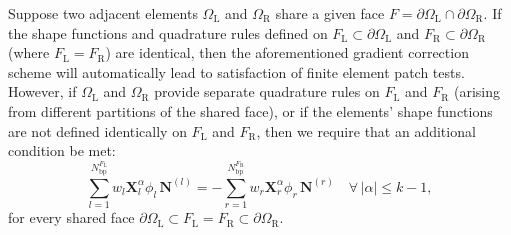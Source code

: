     	Suppose two adjacent elements $\Omega_{\mathrm L}$ and $\Omega_{\mathrm R}$ share a given face $F = \partial \Omega_{\mathrm L} \cap \partial \Omega_{\mathrm R}$. If the shape functions and quadrature rules defined on $F_{\mathrm L} \subset \partial \Omega_{\mathrm L}$ and $F_{\mathrm R} \subset \partial \Omega_{\mathrm R}$ (where $F_{\mathrm L} = F_{\mathrm R}$) are identical, then the aforementioned gradient correction scheme will automatically lead to satisfaction of finite element patch tests. However, if $\Omega_{\mathrm L}$ and $\Omega_{\mathrm R}$ provide separate quadrature rules on $F_{\mathrm L}$ and $F_{\mathrm R}$ (arising from different partitions of the shared face), or if the elements' shape functions are not defined identically on $F_{\mathrm L}$ and $F_{\mathrm R}$, then we require that an additional condition be met:
    	\begin{equation}
    		\sum_{l=1}^{N^{F_{\mathrm L}}_{\mathrm b\mathrm p}} w_l \bm{X}^{\alpha}_l \phi_l \, \bm{N}^{(l)} = - \sum_{r=1}^{N^{F_{\mathrm R}}_{\mathrm b\mathrm p}} w_r \bm{X}^{\alpha}_r \phi_r \, \bm{N}^{(r)} \quad \forall \, | \alpha | \leq k-1,
    		\label{eq:face_constraint}
    	\end{equation}
    	for every shared face $\partial \Omega_{\mathrm L} \subset F_{\mathrm L} = F_{\mathrm R} \subset \partial \Omega_{\mathrm R}$.
		
